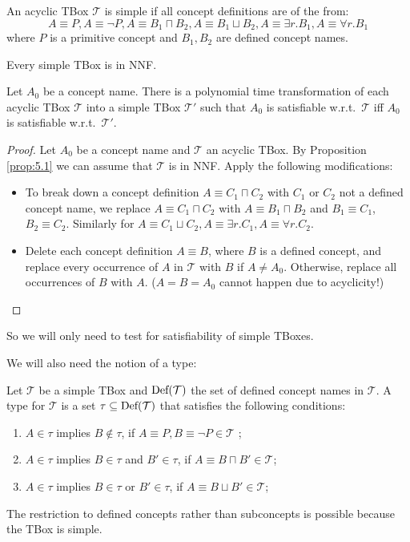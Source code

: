 \begin{definition*}
	An acyclic TBox $\mathcal{T}$ is simple if all concept definitions are of the from:
	\[
	A \equiv P, A \equiv \neg P, A \equiv B_1 \sqcap B_2, A \equiv B_1 \sqcup B_2, A \equiv \exists r.B_1, A \equiv \forall r.B_1
	\]
	where $P$ is a primitive concept and $B_1, B_2$ are defined concept names.
\end{definition*}
\begin{note}
	Every simple TBox is in NNF.
\end{note}

\begin{lemma}\label{lem:5.2}
	Let $A_0$ be a concept name.
	There is a polynomial time transformation of each acyclic TBox $\mathcal{T}$
	into a simple TBox $\mathcal{T}'$ such that $A_0$ is satisfiable w.r.t.\ $\mathcal{T}$ 
	iff $A_0$ is satisfiable w.r.t.\ $\mathcal{T}'$.
\end{lemma}
\begin{proof}
	Let $A_0$ be a concept name and $\mathcal{T}$ an acyclic TBox.
	By Proposition \ref{prop:5.1} we can assume that $\mathcal{T}$ is in NNF.
	Apply the following modifications:
	\begin{itemize}
		\item To break down a concept definition $A \equiv C_1 \sqcap C_2$
			with $C_1$ or $C_2$ not a defined concept name,
			we replace $A \equiv C_1 \sqcap C_2$ with $A \equiv B_1 \sqcap B_2$ 
			and $B_1 \equiv C_1$, $B_2 \equiv C_2$.
			Similarly for $A \equiv C_1 \sqcup C_2, A \equiv \exists r.C_1, A \equiv \forall r.C_2$.
		\item Delete each concept definition $A \equiv B$, where $B$ is a defined concept,
			and replace every occurrence of $A$ in $\mathcal{T}$ with $B$ if $A \neq A_0$.
			Otherwise, replace all occurrences of $B$ with $A$.
			($A = B = A_0$ cannot happen due to acyclicity!)
			\qedhere
	\end{itemize}
\end{proof}
So we will only need to test for satisfiability of simple TBoxes.

We will also need the notion of a type:
\begin{definition}[Type]
	Let $\mathcal{T}$ be a simple TBox and $\operatorname{\text{Def}}(\mathcal{T})$ the set of defined concept names in $\mathcal{T}$.
	A type for $\mathcal{T}$ is a set $\tau \subseteq \operatorname{\text{Def}}(\mathcal{T})$
	that satisfies the following conditions:
	\begin{enumerate}
		\item $A \in \tau$ implies $B \notin \tau$, if $A \equiv P, B \equiv \neg P \in \mathcal{T}$ ;
		\item $A \in \tau$ implies $B \in \tau$ and $B' \in \tau$, if $A \equiv B \sqcap B' \in \mathcal{T}$;
		\item $A \in \tau$ implies $B \in \tau$ or $B' \in \tau$, if $A \equiv B \sqcup B' \in \mathcal{T}$;
	\end{enumerate}
\end{definition}
\begin{note}
	The restriction to defined concepts rather than subconcepts is possible because the TBox is simple.
\end{note}

